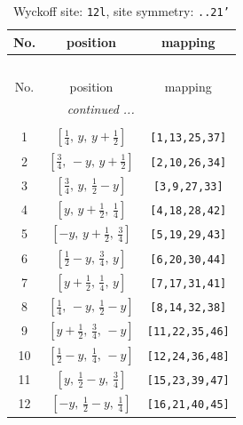 \documentclass[fleqn,8pt]{jsarticle}
\begin{document}
\begin{longtable}{ccc}
\caption{Wyckoff site: {\tt 12l}, site symmetry: {\tt ..21'}}
 \\
 \hline \hline
No. & position & mapping \\ \hline \endfirsthead

\multicolumn{2}{l}{\tablename\ \thetable{}} \\
 \hline \hline
No. & position & mapping \\ \hline \endhead

 \hline \hline
\multicolumn{2}{r}{\footnotesize\it continued ...} \\ \endfoot

 \hline \hline
\multicolumn{2}{r}{} \\ \endlastfoot

1 & $\left[ \frac{1}{4},\, y,\, y + \frac{1}{2} \right]$ & {\tt [1,13,25,37]} \\ \hline
2 & $\left[ \frac{3}{4},\, - y,\, y + \frac{1}{2} \right]$ & {\tt [2,10,26,34]} \\ \hline
3 & $\left[ \frac{3}{4},\, y,\, \frac{1}{2} - y \right]$ & {\tt [3,9,27,33]} \\ \hline
4 & $\left[ y,\, y + \frac{1}{2},\, \frac{1}{4} \right]$ & {\tt [4,18,28,42]} \\ \hline
5 & $\left[ - y,\, y + \frac{1}{2},\, \frac{3}{4} \right]$ & {\tt [5,19,29,43]} \\ \hline
6 & $\left[ \frac{1}{2} - y,\, \frac{3}{4},\, y \right]$ & {\tt [6,20,30,44]} \\ \hline
7 & $\left[ y + \frac{1}{2},\, \frac{1}{4},\, y \right]$ & {\tt [7,17,31,41]} \\ \hline
8 & $\left[ \frac{1}{4},\, - y,\, \frac{1}{2} - y \right]$ & {\tt [8,14,32,38]} \\ \hline
9 & $\left[ y + \frac{1}{2},\, \frac{3}{4},\, - y \right]$ & {\tt [11,22,35,46]} \\ \hline
10 & $\left[ \frac{1}{2} - y,\, \frac{1}{4},\, - y \right]$ & {\tt [12,24,36,48]} \\ \hline
11 & $\left[ y,\, \frac{1}{2} - y,\, \frac{3}{4} \right]$ & {\tt [15,23,39,47]} \\ \hline
12 & $\left[ - y,\, \frac{1}{2} - y,\, \frac{1}{4} \right]$ & {\tt [16,21,40,45]} \\
\end{longtable}
\renewcommand{\arraystretch}{1.2}
\end{document}
